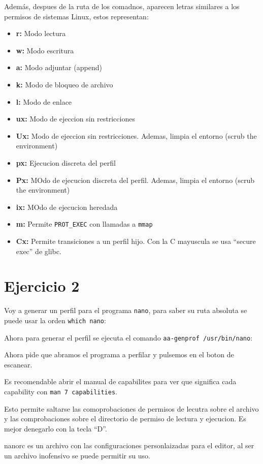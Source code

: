 \documentclass{article}
\begin{document}
Además, despues de la ruta de los comadnos, aparecen letras similares a los permisos de sistemas Linux, estos representan:

\begin{itemize}
    \item \textbf{r: }Modo lectura
    \item \textbf{w: }Modo escritura
    \item \textbf{a: }Modo adjuntar (append)
    \item \textbf{k: }Modo de bloqueo de archivo
    \item \textbf{l: }Modo de enlace
    \item \textbf{ux: }Modo de ejeccion sin restricciones
    \item \textbf{Ux: }Modo de ejeccion sin restricciones. Ademas, limpia el entorno (scrub the environment)
    \item \textbf{px: }Ejecucion discreta del perfil
    \item \textbf{Px: }MOdo de ejecucion discreta del perfil. Ademas, limpia el entorno (scrub the environment)
    \item \textbf{ix: }MOdo de ejecucion heredada
    \item \textbf{m: }Permite \verb|PROT_EXEC| con llamadas a \verb|mmap|
    \item \textbf{Cx: }Permite transiciones a un perfil hijo. Con la C mayuscula se usa ``secure exec'' de glibc.
\end{itemize}


\section*{Ejercicio 2}
Voy a generar un perfil para el programa \verb|nano|, para saber su ruta absoluta se puede usar la orden \verb|which nano|:


Ahora para generar el perfil se ejecuta el comando \verb|aa-genprof /usr/bin/nano|:


Ahora pide que abramos el programa a perfilar y pulsemos en el boton de escanear.

Es recomendable abrir el manual de capabilites para ver que significa cada capability con \verb|man 7 capabilities|.


Esto permite saltarse las comoprobaciones de permisos de lecutra sobre el archivo y las comprobaciones sobre el directorio de permiso de lectura y ejecucion. Es mejor denegarlo con la tecla ``D''.

nanorc es un archivo con las configuraciones personlaizadas para el editor, al ser un archivo inofensivo se puede permitir su uso.
\end{document}
